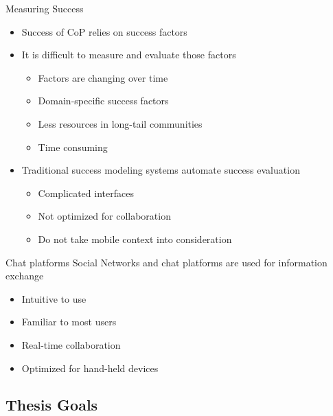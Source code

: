 \begin{frame}{Measuring Success}
  \begin{itemize}
    \item Success of CoP relies on success factors
    \item It is difficult to measure and evaluate those factors
          \begin{itemize}
            \item Factors are changing over time \cite{Renz16}
            \item Domain-specific success factors
            \item Less resources in long-tail communities
            \item Time consuming
          \end{itemize}
    \item Traditional success modeling systems automate success evaluation
          \begin{itemize}
            \item Complicated interfaces
            \item Not optimized for collaboration
            \item Do not take mobile context into consideration \cite{Renz16}
          \end{itemize}
  \end{itemize}
\end{frame}

\begin{frame}{Chat platforms}
  Social Networks and chat platforms are used for information exchange
  \begin{itemize}
    \item Intuitive to use
    \item Familiar to most users
    \item Real-time collaboration
    \item Optimized for hand-held devices
  \end{itemize}
\end{frame}


\subsection{Thesis Goals}

